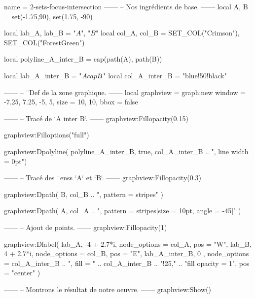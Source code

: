 \documentclass[border = 3pt]{standalone}
\begin{document}
\begin{luadraw*}{name = 2-sets-focus-intersection}
------
-- Nos ingrédients de base.
------
local A, B = set(-1.75,90), set(1.75, -90)

local lab_A, lab_B = "$A$", "$B$"
local col_A, col_B = SET_COL("Crimson"), SET_COL("ForestGreen")

local polyline_A_inter_B = cap(path(A), path(B))

local lab_A_inter_B       = "$A \\cap B$"
local col_A_inter_B       = "blue!50!black"

------
-- ¨Def de la zone graphique.
------
local graphview = graph:new{
  window = {-7.25, 7.25, -5, 5},
  size   = {10, 10},
  bbox   = false
}

------
-- Tracé de `A inter B`.
------
graphview:Fillopacity(0.15)

graphview:Filloptions("full")

graphview:Dpolyline(
  polyline_A_inter_B,
  true,
  col_A_inter_B .. ", line width = 0pt")

------
-- Tracé des ¨enss `A` et `B`.
------
graphview:Fillopacity(0.3)

graphview:Dpath(
  B,
  col_B .. ", pattern = stripes"
)

graphview:Dpath(
  A,
  col_A .. ", pattern = {stripes[size = 10pt, angle = -45]}"
)


------
-- Ajout de points.
------
graphview:Fillopacity(1)

graphview:Dlabel(
  lab_A, -4 + 2.7*i, {node_options = col_A, pos = "W"},
  lab_B, 4 + 2.7*i, {node_options = col_B, pos = "E"},
  lab_A_inter_B, 0 , {
    node_options = col_A_inter_B
                .. ", fill = " .. col_A_inter_B .. "!25,"
                .. "fill opacity = 1",
    pos = "center"
  }
)

------
-- Montrons le résultat de notre oeuvre.
------
graphview:Show()
\end{luadraw*}
\end{document}
